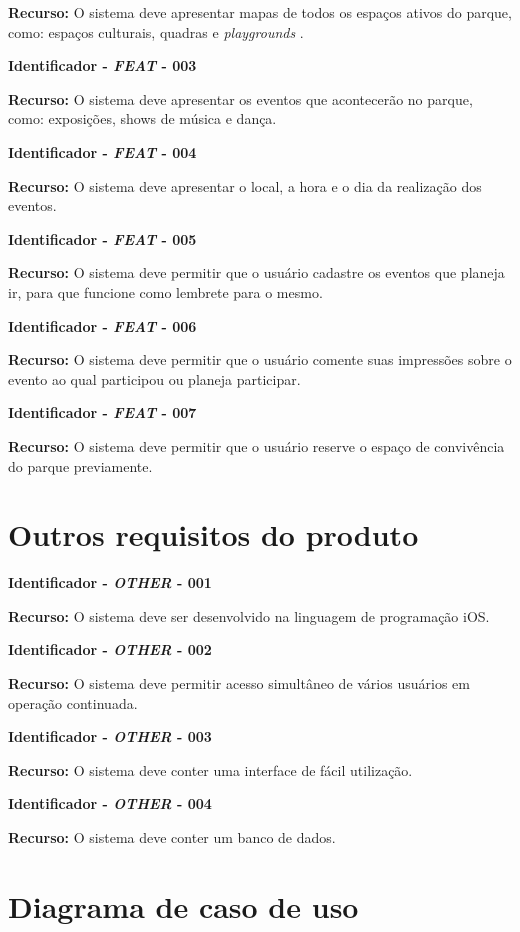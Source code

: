 \begin{anexosenv}
\textbf{Recurso:} O sistema deve apresentar mapas de todos os espaços ativos do parque, como: espaços culturais, quadras e \textit{playgrounds} .

\textbf{Identificador - \textit{FEAT} - 003} 

\textbf{Recurso:} O sistema deve apresentar os eventos que acontecerão no parque, como: exposições, shows de música e dança.

\textbf{Identificador - \textit{FEAT} - 004} 

\textbf{Recurso:} O sistema deve apresentar o local, a hora e o dia da realização dos eventos.

\textbf{Identificador - \textit{FEAT} - 005} 

\textbf{Recurso:} O sistema deve permitir que o usuário cadastre os eventos que planeja ir, para que funcione como lembrete para o mesmo.

\textbf{Identificador - \textit{FEAT} - 006} 

\textbf{Recurso:} O sistema deve permitir que o usuário comente suas impressões sobre o evento ao qual participou ou planeja participar.

\textbf{Identificador - \textit{FEAT} - 007} 

\textbf{Recurso:} O sistema deve permitir que o usuário reserve o espaço de convivência do parque previamente.

\section {Outros requisitos do produto}

\textbf{Identificador - \textit{OTHER} - 001} 

\textbf{Recurso:} O sistema deve ser desenvolvido na linguagem de programação iOS.

\textbf{Identificador - \textit{OTHER} - 002} 

\textbf{Recurso:} O sistema deve permitir acesso simultâneo de vários usuários em operação continuada.

\textbf{Identificador - \textit{OTHER} - 003} 

\textbf{Recurso:} O sistema deve conter uma interface de fácil utilização.

\textbf{Identificador - \textit{OTHER} - 004} 

\textbf{Recurso:} O sistema deve conter um banco de dados.

\section {Diagrama de caso de uso}


\end{anexosenv}
